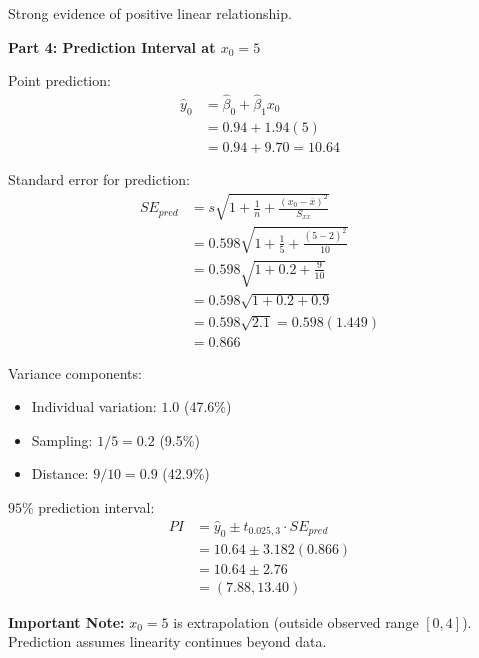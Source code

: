 \documentclass[10pt,twocolumn]{article}
\begin{document}
Strong evidence of positive linear relationship.

\textbf{Part 4: Prediction Interval at $x_0=5$}

Point prediction:
\begin{align*}
\hat{y}_0 &= \hat{\beta}_0 + \hat{\beta}_1 x_0 \\
&= 0.94 + 1.94(5) \\
&= 0.94 + 9.70 = \boxed{10.64}
\end{align*}

Standard error for prediction:
\begin{align*}
SE_{pred} &= s\sqrt{1 + \frac{1}{n} + \frac{(x_0-\bar{x})^2}{S_{xx}}} \\
&= 0.598\sqrt{1 + \frac{1}{5} + \frac{(5-2)^2}{10}} \\
&= 0.598\sqrt{1 + 0.2 + \frac{9}{10}} \\
&= 0.598\sqrt{1 + 0.2 + 0.9} \\
&= 0.598\sqrt{2.1} = 0.598(1.449) \\
&= \boxed{0.866}
\end{align*}

Variance components:
\begin{itemize}
\item Individual variation: $1.0$ (47.6\%)
\item Sampling: $1/5 = 0.2$ (9.5\%)
\item Distance: $9/10 = 0.9$ (42.9\%)
\end{itemize}

$95\%$ prediction interval:
\begin{align*}
PI &= \hat{y}_0 \pm t_{0.025,3} \cdot SE_{pred} \\
&= 10.64 \pm 3.182(0.866) \\
&= 10.64 \pm 2.76 \\
&= \boxed{(7.88, 13.40)}
\end{align*}

\textbf{Important Note:} $x_0=5$ is extrapolation (outside observed range $[0,4]$). Prediction assumes linearity continues beyond data.
\end{document}
